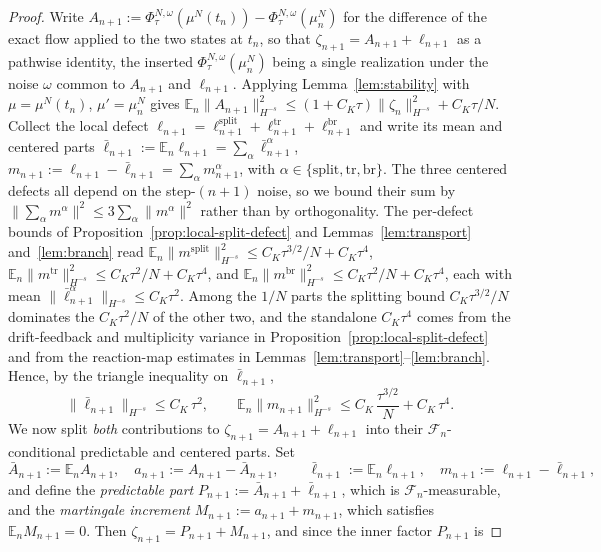 \documentclass[a4paper,fleqn]{cas-sc}
\theoremstyle{definition}
\theoremstyle{remark}
\begin{document}
\begin{proof}
Write $A_{n+1}:=\Phi^{N,\omega}_\tau(\mu^N(t_n))-\Phi^{N,\omega}_\tau(\mu^N_n)$ for
the difference of the exact flow applied to the two states at $t_n$, so that
$\zeta_{n+1}=A_{n+1}+\ell_{n+1}$ as a pathwise identity, the inserted
$\Phi^{N,\omega}_\tau(\mu^N_n)$ being a single realization under the noise $\omega$
common to $A_{n+1}$ and $\ell_{n+1}$. Applying Lemma~\ref{lem:stability} with
$\mu=\mu^N(t_n)$, $\mu'=\mu^N_n$ gives
$\mathbb E_n\|A_{n+1}\|_{H^{-s}}^2\le(1+C_K\tau)\|\zeta_n\|_{H^{-s}}^2+C_K\tau/N$.
Collect the local defect $\ell_{n+1}=\ell^{\mathrm{split}}_{n+1}
+\ell^{\mathrm{tr}}_{n+1}+\ell^{\mathrm{br}}_{n+1}$
and write its mean and centered parts $\bar\ell_{n+1}:=\mathbb E_n\ell_{n+1}
=\sum_\alpha\bar\ell^\alpha_{n+1}$, $m_{n+1}:=\ell_{n+1}-\bar\ell_{n+1}
=\sum_\alpha m^\alpha_{n+1}$, with $\alpha\in\{\mathrm{split},\mathrm{tr},\mathrm{br}\}$.
The three centered defects all depend on the step-$(n{+}1)$ noise, so we bound their sum by
$\|\sum_\alpha m^\alpha\|^2\le3\sum_\alpha\|m^\alpha\|^2$ rather than by orthogonality. The per-defect
bounds of Proposition~\ref{prop:local-split-defect} and Lemmas~\ref{lem:transport} and~\ref{lem:branch}
read $\mathbb E_n\|m^{\mathrm{split}}\|_{H^{-s}}^2\le C_K\tau^{3/2}/N+C_K\tau^4$,
$\mathbb E_n\|m^{\mathrm{tr}}\|_{H^{-s}}^2\le C_K\tau^2/N+C_K\tau^4$, and
$\mathbb E_n\|m^{\mathrm{br}}\|_{H^{-s}}^2\le C_K\tau^2/N+C_K\tau^4$, each with mean
$\|\bar\ell^\alpha_{n+1}\|_{H^{-s}}\le C_K\tau^2$. Among the $1/N$ parts the splitting bound
$C_K\tau^{3/2}/N$ dominates the $C_K\tau^2/N$ of the other two, and the standalone $C_K\tau^4$ comes from
the drift-feedback and multiplicity variance in Proposition~\ref{prop:local-split-defect} and from the
reaction-map estimates in Lemmas~\ref{lem:transport}--\ref{lem:branch}. Hence, by the triangle inequality
on $\bar\ell_{n+1}$,
\[
\|\bar\ell_{n+1}\|_{H^{-s}}\le C_K\,\tau^2,
\qquad
\mathbb E_n\|m_{n+1}\|_{H^{-s}}^2\le C_K\,\frac{\tau^{3/2}}{N}+C_K\,\tau^4.
\]
We now split \emph{both} contributions to $\zeta_{n+1}=A_{n+1}+\ell_{n+1}$ into
their $\mathcal F_n$-conditional predictable and centered parts. Set
\[
\bar A_{n+1}:=\mathbb E_n A_{n+1},\quad a_{n+1}:=A_{n+1}-\bar A_{n+1},
\qquad
\bar\ell_{n+1}:=\mathbb E_n\ell_{n+1},\quad m_{n+1}:=\ell_{n+1}-\bar\ell_{n+1},
\]
and define the \emph{predictable part} $P_{n+1}:=\bar A_{n+1}+\bar\ell_{n+1}$, which
is $\mathcal F_n$-measurable, and the \emph{martingale increment}
$M_{n+1}:=a_{n+1}+m_{n+1}$, which satisfies $\mathbb E_n M_{n+1}=0$. Then
$\zeta_{n+1}=P_{n+1}+M_{n+1}$, and since the inner factor $P_{n+1}$ is

\end{proof}
\end{document}
